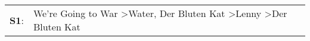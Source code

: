 \begin{supertabular}{p{0.03\textwidth}p{0.92\textwidth}}
 \textbf{S1}:  &  We're Going to War\textsuperscript{} \textgreater \enspace Water\textsuperscript{}, \enspace Der Bluten Kat\textsuperscript{} \textgreater \enspace Lenny\textsuperscript{} \textgreater \enspace Der Bluten Kat\textsuperscript{}  \enspace  \\
\end{supertabular}
